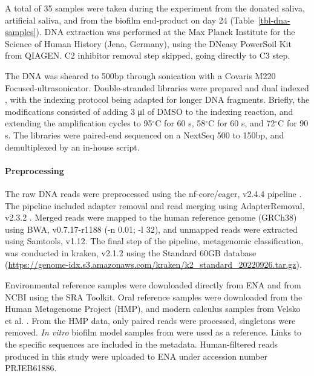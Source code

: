 \documentclass[10pt,a4paper]{article}
\begin{document}
A total of 35 samples were taken during the experiment from the donated
saliva, artificial saliva, and from the biofilm end-product on day 24
(Table~\ref{tbl-dna-samples}). DNA extraction was performed at the Max
Planck Institute for the Science of Human History (Jena, Germany), using
the DNeasy PowerSoil Kit from QIAGEN. C2 inhibitor removal step skipped,
going directly to C3 step.

The DNA was sheared to 500bp through sonication with a Covaris M220
Focused-ultrasonicator. Double-stranded libraries were prepared
\citep{aronHalfUDG2020} and dual indexed
\citep{stahlDoublestrandedIndexing2019}, with the indexing protocol
being adapted for longer DNA fragments. Briefly, the modifications
consisted of adding 3 μl of DMSO to the indexing reaction, and extending
the amplification cycles to 95\(^{\circ}\)C for 60 s, 58\(^{\circ}\)C
for 60 s, and 72\(^{\circ}\)C for 90 s. The libraries were paired-end
sequenced on a NextSeq 500 to 150bp, and demultiplexed by an in-house
script.

\paragraph{Preprocessing}\label{preprocessing}

The raw DNA reads were preprocessed using the nf-core/eager, v2.4.4
pipeline \citep{yatesEAGER2020}. The pipeline included adapter removal
and read merging using AdapterRemoval, v2.3.2 \citep{AdapterRemovalv2}.
Merged reads were mapped to the human reference genome (GRCh38) using
BWA, v0.7.17-r1188 \citep{BWA} (-n 0.01; -l 32), and unmapped reads were
extracted using Samtools, v1.12. The final step of the pipeline,
metagenomic classification, was conducted in kraken, v2.1.2
\citep{kraken2} using the Standard 60GB database
(\url{https://genome-idx.s3.amazonaws.com/kraken/k2_standard_20220926.tar.gz}).

Environmental reference samples were downloaded directly from ENA and
from NCBI using the SRA Toolkit. Oral reference samples were downloaded
from the Human Metagenome Project (HMP), and modern calculus samples
from Velsko et al. \citeyearpar{velskoDentalCalculus2017}. From the HMP
data, only paired reads were processed, singletons were removed.
\emph{In vitro} biofilm model samples from
\citet{edlundUncoveringComplex2018} were used as a reference. Links to
the specific sequences are included in the metadata. Human-filtered
reads produced in this study were uploaded to ENA under accession number
PRJEB61886.
\end{document}
